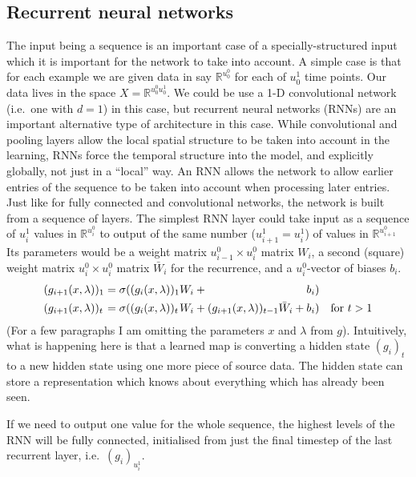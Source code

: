 \subsection{Recurrent neural networks}
The input being a sequence is an important case of a specially-structured input which it is important for the network to take into account.
A simple case is that for each example we are given data in say $\mathbb{R}^{u_0^0}$ for each of $u_0^1$ time points.
Our data lives in the space $X=\mathbb{R}^{u_0^0u_0^1}$.
We could be use a 1-D convolutional network (i.e.~one with $d=1$) in this case, but recurrent neural networks (RNNs) are an important alternative type of architecture in this case.
While convolutional and pooling layers allow the local spatial structure to be taken into account in the learning, RNNs force the temporal structure into the model, and explicitly globally, not just in a ``local'' way.
An RNN allows the network to allow earlier entries of the sequence to be taken into account when processing later entries.
Just like for fully connected and convolutional networks, the network is built from a sequence of layers.
The simplest RNN layer could take input as a sequence of $u_i^1$ values in $\mathbb{R}^{u_i^0}$ to output of the same number ($u_{i+1}^1=u_i^1$) of values in $\mathbb{R}^{u_{i+1}^0}$ %
Its parameters would be a weight matrix
 $u_{i-1}^0\times u_i^0$ matrix $W_i$, a second (square) weight matrix
 $u_i^0\times u_i^0$ matrix $\bar W_i$ for the recurrence, and a $u_i^0$-vector of biases $b_i$.
\begin{align}
  (g_{i+1}(x,\lambda))_1&=\sigma((g_i(x,\lambda))_1W_i+{}\phantom{(g_{i+1}(x,\lambda))_{t-1}\bar W_i+{}}b_i)\\
  (g_{i+1}(x,\lambda))_{\mathrlap{t}\phantom{1}}&=\sigma((g_i(x,\lambda))_{\mathrlap{t}\phantom{1}}W_i+           (g_{i+1}(x,\lambda))_{t-1}\bar W_i+b_i)&\text{for $t>1$}
\end{align}
(For a few paragraphs I am omitting the parameters $x$ and $\lambda$ from $g$).
Intuitively, what is happening here is that a learned map is converting a hidden state $(g_{i})_t$ to a new hidden state using one more piece of source data.
The hidden state can store a representation which knows about everything which has already been seen.

If we need to output one value for the whole sequence, the highest levels of the RNN will be fully connected, initialised from just the final timestep of the last recurrent layer, i.e.~$(g_{i})_{u_i^1}$.

